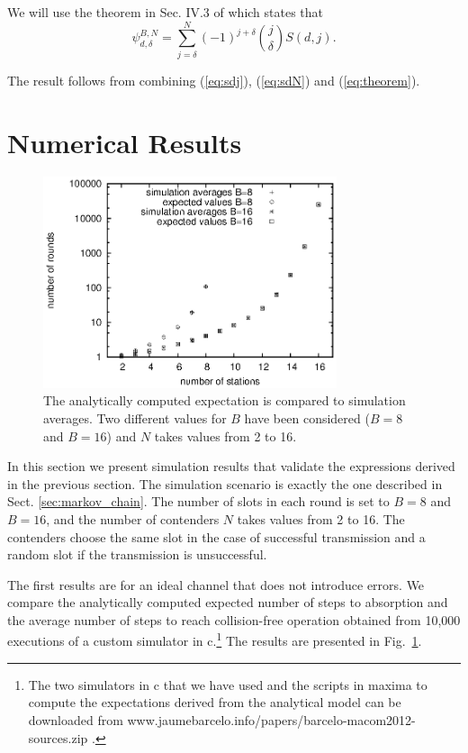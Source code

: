 \documentclass[journal]{IEEEtran}
\begin{document}
We will use the theorem in Sec. IV.3 of \cite{feller1968ipt} which states that
\begin{equation}
\label{eq:theorem}
\psi^{B,N}_{d,\delta} = \sum_{j=\delta}^{N} (-1)^{j+\delta}\binom{j}{\delta} S(d,j).
\end{equation}

The result follows from combining (\ref{eq:sdj}), (\ref{eq:sdN}) and (\ref{eq:theorem}).


\section{Numerical Results}
\label{sec:numerical_results}

\begin{figure}
\centering
\includegraphics[height=6.2cm]{figures/convergence_avg}
\caption{The analytically computed expectation is compared to simulation averages. Two different values for $B$ have been considered ($B=8$ and $B=16$) and $N$ takes values from 2 to 16.}
\label{fig:convergence_avg}
\end{figure}


In this section we present simulation results that validate the expressions derived in the previous section.
The simulation scenario is exactly the one described in Sect. \ref{sec:markov_chain}.
The number of slots in each round is set to $B=8$ and $B=16$, and the number of contenders $N$ takes values from 2 to 16.
The contenders choose the same slot in the case of successful transmission and a random slot if the transmission is unsuccessful.

The first results are for an ideal channel that does not introduce errors.
We compare the analytically computed expected number of steps to absorption and the average number of steps to reach collision-free operation obtained from 10,000 executions of a custom simulator in c.\footnote{The two simulators in c that we have used and the scripts in maxima to compute the expectations derived from the analytical model can be downloaded from www.jaumebarcelo.info/papers/barcelo-macom2012-sources.zip .} 
The results are presented in Fig.~\ref{fig:convergence_avg}.
\end{document}
